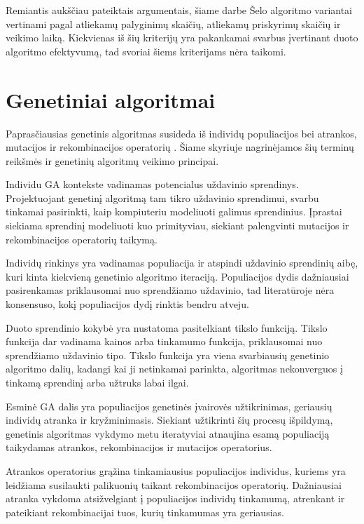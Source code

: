 \documentclass{VUMIFInfBakalaurinis}
\begin{document}
Remiantis aukščiau pateiktais argumentais, šiame darbe Šelo algoritmo variantai vertinami pagal
atliekamų palyginimų skaičių, atliekamų priskyrimų skaičių ir veikimo laiką.
Kiekvienas iš šių kriterijų yra pakankamai svarbus įvertinant duoto algoritmo efektyvumą, tad svoriai šiems kriterijams nėra taikomi.

\section{Genetiniai algoritmai}

Paprasčiausias genetinis algoritmas susideda iš individų populiacijos bei atrankos, mutacijos ir rekombinacijos operatorių \cite{simpson1999faster}.
Šiame skyriuje nagrinėjamos šių terminų reikšmės ir genetinių algoritmų veikimo principai.

Individu GA kontekste vadinamas potencialus uždavinio sprendinys.
Projektuojant genetinį algoritmą tam tikro uždavinio sprendimui, svarbu tinkamai pasirinkti,
kaip kompiuteriu modeliuoti galimus sprendinius.
Įprastai siekiama sprendinį modeliuoti kuo primityviau, siekiant
palengvinti mutacijos ir rekombinacijos operatorių taikymą.

Individų rinkinys yra vadinamas populiacija ir atspindi uždavinio sprendinių aibę, kuri kinta kiekvieną genetinio algoritmo iteraciją.
Populiacijos dydis dažniausiai pasirenkamas priklausomai nuo sprendžiamo uždavinio,
tad literatūroje nėra konsensuso, kokį populiacijos dydį rinktis bendru atveju.

Duoto sprendinio kokybė yra nustatoma pasitelkiant tikslo funkciją.
Tikslo funkcija dar vadinama kainos arba tinkamumo funkcija, priklausomai nuo sprendžiamo uždavinio tipo.
Tikslo funkcija yra viena svarbiausių genetinio algoritmo dalių,
kadangi kai ji netinkamai parinkta, algoritmas nekonverguos į tinkamą sprendinį arba užtruks labai ilgai.

Esminė GA dalis yra populiacijos genetinės įvairovės užtikrinimas, geriausių individų atranka ir kryžminimasis.
Siekiant užtikrinti šių procesų išpildymą, genetinis algoritmas vykdymo metu
iteratyviai atnaujina esamą populiaciją taikydamas atrankos, rekombinacijos ir mutacijos operatorius.

Atrankos operatorius grąžina tinkamiausius populiacijos individus, kuriems yra leidžiama susilaukti palikuonių taikant rekombinacijos operatorių.
Dažniausiai atranka vykdoma atsižvelgiant į populiacijos individų tinkamumą, atrenkant ir pateikiant rekombinacijai tuos, kurių tinkamumas yra geriausias.
\end{document}
